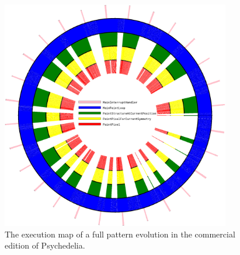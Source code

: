 \begin{figure}[H]                                                          
  \centering                                                             
  \begin{adjustbox}{width=8cm,center}                                   
  \includegraphics[width=10cm]{src/listing_commentary/execution_cycle.png}%
  \end{adjustbox}                                                        
\caption{The execution map of a full pattern evolution in the commercial edition of Psychedelia.}                                           
\end{figure}                                                               

